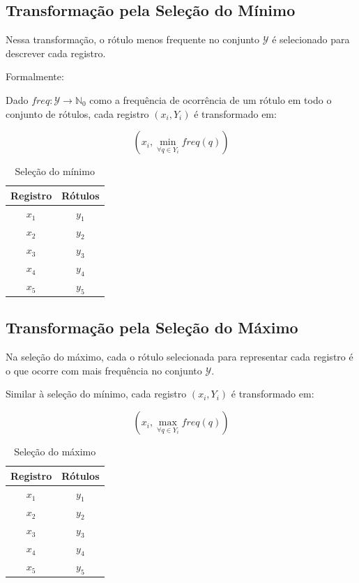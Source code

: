 \documentclass[runningheads,a4paper]{llncs}
\begin{document}
\subsection{Transformação pela Seleção do Mínimo}

Nessa transformação, o rótulo menos frequente no conjunto $\mathcal{Y}$ é selecionado para descrever cada registro.

Formalmente:

Dado $freq : \mathcal{Y} \to \mathbb{N}_0$ como a frequência de ocorrência de um rótulo em todo o conjunto de rótulos, cada registro $(x_i, Y_i)$ é transformado em:

$$(x_i, \min_{\forall q \in Y_i} freq(q))$$

\begin{table}
	\centering
	\begin{tabular}{| c | c |}
		\hline
		\textbf{Registro} & \textbf{Rótulos} \\
		\hline
		$x_1$ & $y_1$ \\
		\hline
		$x_2$ & $y_2$ \\
		\hline
		$x_3$ & $y_3$ \\
		\hline
		$x_4$ & $y_4$ \\
		\hline
		$x_5$ & $y_5$ \\
		\hline
	\end{tabular}
	\caption{Seleção do mínimo}
	\label{tab:exselmin}
\end{table}

\subsection{Transformação pela Seleção do Máximo}

Na seleção do máximo, cada o rótulo selecionada para representar cada registro é o que ocorre com mais frequência no conjunto $\mathcal{Y}$.

Similar à seleção do mínimo, cada registro $(x_i, Y_i)$ é transformado em:

$$(x_i, \max_{\forall q \in Y_i} freq(q))$$

\begin{table}
	\centering
	\begin{tabular}{| c | c |}
		\hline
		\textbf{Registro} & \textbf{Rótulos} \\
		\hline
		$x_1$ & $y_1$ \\
		\hline
		$x_2$ & $y_2$ \\
		\hline
		$x_3$ & $y_3$ \\
		\hline
		$x_4$ & $y_4$ \\
		\hline
		$x_5$ & $y_5$ \\
		\hline
	\end{tabular}
	\caption{Seleção do máximo}
	\label{tab:exselmax}
\end{table}
\end{document}
